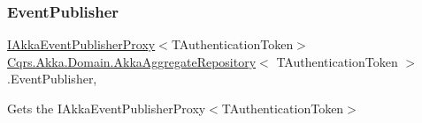 \subsubsection{\texorpdfstring{Event\+Publisher}{EventPublisher}}
{\footnotesize\ttfamily \hyperlink{interfaceCqrs_1_1Akka_1_1Events_1_1IAkkaEventPublisherProxy}{I\+Akka\+Event\+Publisher\+Proxy}$<$T\+Authentication\+Token$>$ \hyperlink{classCqrs_1_1Akka_1_1Domain_1_1AkkaAggregateRepository}{Cqrs.\+Akka.\+Domain.\+Akka\+Aggregate\+Repository}$<$ T\+Authentication\+Token $>$.Event\+Publisher\hspace{0.3cm}{\ttfamily [get]}, {\ttfamily [protected]}}



Gets the I\+Akka\+Event\+Publisher\+Proxy$<$\+T\+Authentication\+Token$>$ 

